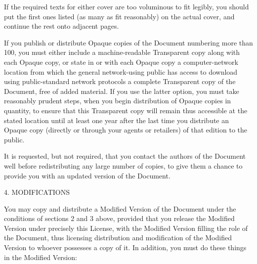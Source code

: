 \documentclass[oneside,english,a4paper,10pt,oneside,openany,final]{memoir}
\begin{document}
If the required texts for either cover are too voluminous to fit legibly, you should put the first ones listed (as many as fit reasonably) on the actual cover, and continue the rest onto adjacent pages.

If you publish or distribute Opaque copies of the Document numbering more than 100, you must either include a machine-readable Transparent copy along with each Opaque copy, or state in or with each Opaque copy a computer-network location from which the general network-using public has access to download using public-standard network protocols a complete Transparent copy of the Document, free of added material. If you use the latter option, you must take reasonably prudent steps, when you begin distribution of Opaque copies in quantity, to ensure that this Transparent copy will remain thus accessible at the stated location until at least one year after the last time you distribute an Opaque copy (directly or through your agents or retailers) of that edition to the public.

It is requested, but not required, that you contact the authors of the Document well before redistributing any large number of copies, to give them a chance to provide you with an updated version of the Document.

4. MODIFICATIONS

You may copy and distribute a Modified Version of the Document under the conditions of sections 2 and 3 above, provided that you release the Modified Version under precisely this License, with the Modified Version filling the role of the Document, thus licensing distribution and modification of the Modified Version to whoever possesses a copy of it. In addition, you must do these things in the Modified Version:
\end{document}
